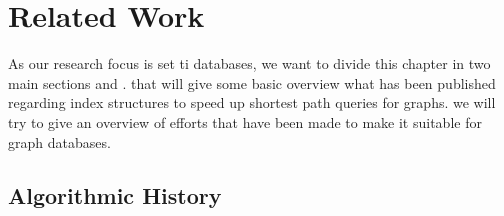 \chapter{Related Work} 

As our research focus is set ti databases, we want to divide this chapter in two main sections  and .
 that will give some basic overview what has been published regarding index structures to speed up shortest path queries for graphs.
 we will try to give an overview of efforts that have been made to make \cite[Customizable Contraction Hierarchies]{CCH} it suitable for graph databases.

\section[Algorithmic History]{Algorithmic History} \label{sec:algorithmic_history}

